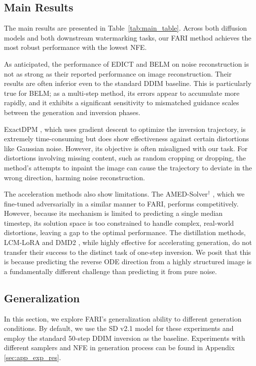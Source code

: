 \documentclass{article}
\begin{document}
\subsection{Main Results}

The main results are presented in Table~\ref{tab:main_table}. Across both diffusion models and both downstream watermarking tasks, our FARI method achieves the most robust performance with the lowest NFE. 

As anticipated, the performance of EDICT \citep{edict2023} and BELM \citep{belm2024} on noise reconstruction is not as strong as their reported performance on image reconstruction. Their results are often inferior even to the standard DDIM baseline. This is particularly true for BELM; as a multi-step method, its errors appear to accumulate more rapidly, and it exhibits a significant sensitivity to mismatched guidance scales between the generation and inversion phases.

ExactDPM \citep{exactdpm2024}, which uses gradient descent to optimize the inversion trajectory, is extremely time-consuming but does show effectiveness against certain distortions like Gaussian noise. However, its objective is often misaligned with our task. For distortions involving missing content, such as random cropping or dropping, the method's attempts to inpaint the image can cause the trajectory to deviate in the wrong direction, harming noise reconstruction.

The acceleration methods also show limitations. The AMED-Solver$^\dagger$ \citep{amed2024}, which we fine-tuned adversarially in a similar manner to FARI, performs competitively. However, because its mechanism is limited to predicting a single median timestep, its solution space is too constrained to handle complex, real-world distortions, leaving a gap to the optimal performance. The distillation methods, LCM-LoRA \citep{lcmlora2023} and DMD2 \citep{dmd2_2024}, while highly effective for accelerating generation, do not transfer their success to the distinct task of one-step inversion. We posit that this is because predicting the reverse ODE direction from a highly structured image is a fundamentally different challenge than predicting it from pure noise.


\subsection{Generalization}
\label{sec:generalization}

In this section, we explore FARI's generalization ability to different generation conditions. By default, we use the SD v2.1 model \citep{ldm_2022} for these experiments and employ the standard 50-step DDIM inversion \citep{ddim_2021} as the baseline. Experiments with different samplers and NFE in generation process can be found in Appendix \ref{sec:app_exp_res}.
\end{document}
